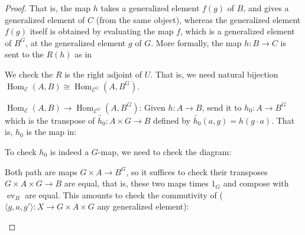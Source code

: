 \documentclass[a4paper]{article}
\DeclareMathOperator{\Hom}{\text {Hom}}
\DeclareMathOperator{\E}{\mathcal E}
\DeclareMathOperator{\ev}{\text {ev}}
\begin{document}
\begin{proof}
    That is, the map $h$ takes a generalized element $f(g)$ of $B$, and gives a generalized element of $C$ (from the same object), whereas the generalized element $f(g)$ itself is obtained by evaluating the map $f$, which is a generalized element of $B^G$, at the generalized element $g$ of $G$. More formally, the map $h:B\to C$ is sent to the $R(h)$ as in 
    \begin{center}
    \end{center}

    We check the $R$ is the right adjoint of $U$. That is, we need natural bijection $\Hom_{\E}(A,B)\cong \Hom_{\E^G}(A,B^G)$.

    $\Hom_{\E}(A,B)\to \Hom_{\E^G}(A,B^G)$: Given $h:A\to B$, send it to $h_0:A\to B^G$ which is the transpose of $\tilde{h_0}:A\times G\to B$ defined by $\tilde{h_0}(a,g)=h(g\cdot a)$. That is, $h_0$ is the map in:
    \begin{center}
    \end{center}

    To check $h_0$ is indeed a $G$-map, we need to check the diagram:
    \begin{center}
    \end{center}

    Both path are maps $G\times A\to B^G$, so it suffices to check their transposes $G\times A \times G\to B$ are equal, that is, these two maps times $1_G$ and compose with $\ev_B$ are equal. This amounts to check the commutivity of ($\langle g,a,g'\rangle: X\to G\times A\times G$ any generalized element): 
    \begin{center}
    \end{center}


\end{proof}
\end{document}

